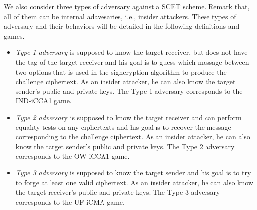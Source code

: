 \documentclass[a4paper,11pt,onecolumn]{elsarticle}
\begin{document}
	
	


	
We also consider three types of adversary against a SCET scheme. Remark that, all of them can be internal adavesaries, i.e., insider attackers.	These types of adversary and their behaviors will be detailed in the following definitions and games.  


	  \begin{itemize}
	  	\item 
	\textit{Type 1 adversary} is  supposed to know the target receiver, but does not have the tag of the target receiver and his goal is to guess which message between two options that is used in the signcryption algorithm to produce the challenge ciphertext. As an insider attacker, he can also know the target sender's public and private keys.   The Type 1 adversary corresponds to the IND-iCCA1 game.
	
	\item \textit{Type 2 adversar}y  is supposed to know the target receiver and can  perform equality tests on any ciphertexts and his goal is to recover the message corresponding to the challenge ciphertext. As an insider attacker, he can also know the target sender's public and private keys.    The Type 2  adversary corresponds to the OW-iCCA1 game.
	
	\item \textit{Type 3 adversary} is supposed to know the target sender and his goal is  to try to forge at least one valid ciphertext. As an insider attacker, he can also know the target receiver's public and private keys.  The Type 3 adversary corresponds to the UF-iCMA game.
	
	  \end{itemize}
	  
\iffalse	
\end{document}
